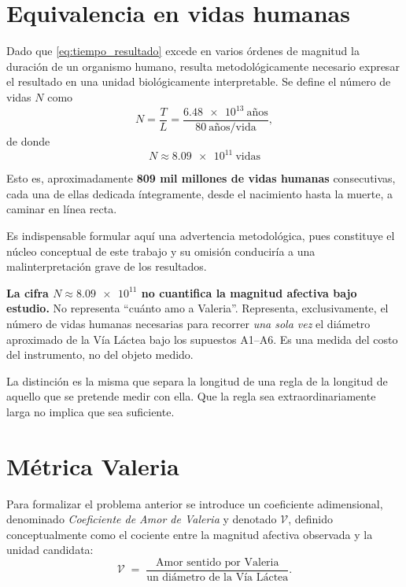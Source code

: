 \documentclass[conference]{IEEEtran}
\newcommand{\Vcoef}{\mathcal{V}}
\begin{document}
\section{Equivalencia en vidas humanas}
\label{sec:vidas}

Dado que \eqref{eq:tiempo_resultado} excede en varios órdenes de magnitud la
duración de un organismo humano, resulta metodológicamente necesario expresar
el resultado en una unidad biológicamente interpretable. Se define el número
de vidas $N$ como
\begin{equation}
N = \frac{T}{L} = \frac{\num{6.48e13}\ \text{años}}{\num{80}\ \text{años/vida}},
\label{eq:vidas_def}
\end{equation}
de donde
\begin{equation}
\boxed{\,N \approx \num{8.09e11}\ \text{vidas}\,}
\label{eq:vidas_resultado}
\end{equation}

Esto es, aproximadamente \textbf{809 mil millones de vidas humanas}
consecutivas, cada una de ellas dedicada íntegramente, desde el nacimiento
hasta la muerte, a caminar en línea recta.

Es indispensable formular aquí una advertencia metodológica, pues constituye
el núcleo conceptual de este trabajo y su omisión conduciría a una
malinterpretación grave de los resultados.

\textbf{La cifra $N \approx \num{8.09e11}$ no cuantifica la magnitud afectiva
bajo estudio.} No representa ``cuánto amo a Valeria''. Representa,
exclusivamente, el número de vidas humanas necesarias para recorrer
\emph{una sola vez} el diámetro aproximado de la Vía Láctea bajo los supuestos
A1--A6. Es una medida del costo del instrumento, no del objeto medido.

La distinción es la misma que separa la longitud de una regla de la longitud
de aquello que se pretende medir con ella. Que la regla sea extraordinariamente
larga no implica que sea suficiente.

\section{Métrica Valeria}
\label{sec:metrica}

Para formalizar el problema anterior se introduce un coeficiente
adimensional, denominado \emph{Coeficiente de Amor de Valeria} y denotado
$\Vcoef$, definido conceptualmente como el cociente entre la magnitud afectiva
observada y la unidad candidata:
\begin{equation}
\Vcoef \;=\;
\frac{\text{Amor sentido por Valeria}}
     {\text{un diámetro de la Vía Láctea}}.
\label{eq:vcoef}
\end{equation}
\end{document}
